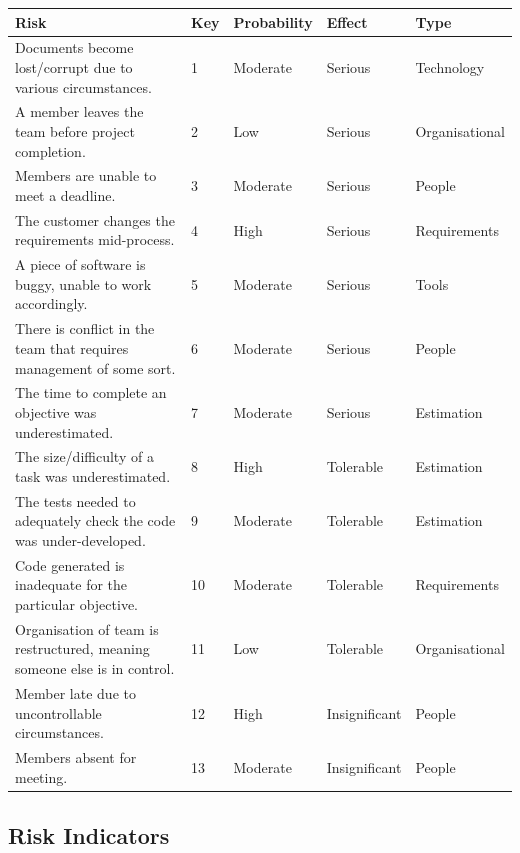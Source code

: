 \documentclass[11pt]{article}
\begin{document}
\begin{center}
\begin{tabular}{|p{}|l|l|l|l|}
\hline
\textbf{Risk} & \textbf{Key} & \textbf{Probability} & \textbf{Effect} & \textbf{Type} \\ \hline
Documents become lost/corrupt due to various circumstances. & 1 & Moderate & Serious & Technology \\ \hline
A member leaves the team before project completion. & 2 & Low & Serious & Organisational \\ \hline
Members are unable to meet a deadline. & 3 & Moderate & Serious & People \\ \hline
The customer changes the requirements mid-process. & 4 & High & Serious & Requirements \\ \hline
A piece of software is buggy, unable to work accordingly. & 5 & Moderate & Serious & Tools \\ \hline
There is conflict in the team that requires management of some sort. & 6 & Moderate & Serious & People \\ \hline
The time to complete an objective was underestimated. & 7 & Moderate & Serious & Estimation \\ \hline
The size/difficulty of a task was underestimated. & 8 & High & Tolerable & Estimation \\ \hline
The tests needed to adequately check the code was under-developed. & 9 & Moderate & Tolerable & Estimation \\ \hline
Code generated is inadequate for the particular objective. & 10 & Moderate & Tolerable & Requirements \\ \hline
Organisation of team is restructured, meaning someone else is in control. & 11 & Low & Tolerable & Organisational \\ \hline
Member late due to uncontrollable circumstances. & 12 & High & Insignificant & People \\ \hline
Members absent for meeting. & 13 & Moderate & Insignificant & People \\ \hline
\end{tabular}
\end{center}

\subsection{Risk Indicators}
\end{document}
